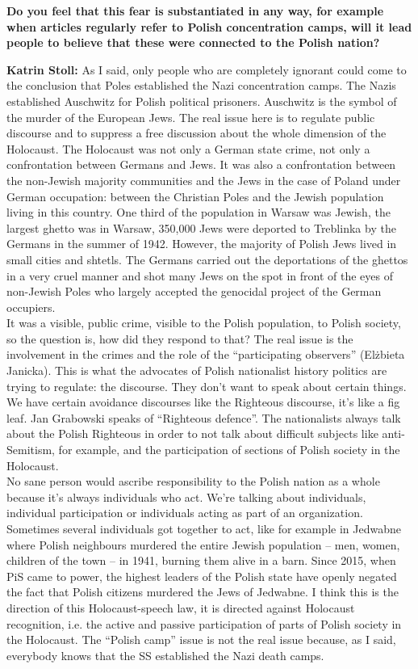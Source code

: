 \textbf{Do you feel that this fear is substantiated in any way, for example when articles regularly refer to Polish concentration camps, will it lead people to believe that these were connected to the Polish nation?}

\textbf{Katrin Stoll:} As I said, only people who are completely ignorant could come to the conclusion that Poles established the Nazi concentration camps. The Nazis established Auschwitz for Polish political prisoners. Auschwitz is the symbol of the murder of the European Jews. The real issue here is to regulate public discourse and to suppress a free discussion about the whole dimension of the Holocaust. The Holocaust was not only a German state crime, not only a confrontation between Germans and Jews. It was also a confrontation between the non-Jewish majority communities and the Jews in the case of Poland under German occupation: between the Christian Poles and the Jewish population living in this country. One third of the population in Warsaw was Jewish, the largest ghetto was in Warsaw, 350,000 Jews were deported to Treblinka by the Germans in the summer of 1942. However, the majority of Polish Jews lived in small cities and shtetls. The Germans carried out the deportations of the ghettos in a very cruel manner and shot many Jews on the spot in front of the eyes of non-Jewish Poles who largely accepted the genocidal project of the German occupiers.\\ 
It was a visible, public crime, visible to the Polish population, to Polish society, so the question is, how did they respond to that?  The real issue is the involvement in the crimes and the role of the ``participating observers'' (Elżbieta Janicka). This is what the advocates of Polish nationalist history politics are trying to regulate: the discourse. They don’t want to speak about certain things. We have certain avoidance discourses like the Righteous discourse, it’s like a fig leaf. Jan Grabowski speaks of ``Righteous defence''. The nationalists always talk about the Polish Righteous in order to not talk about difficult subjects like anti-Semitism, for example, and the participation of sections of Polish society in the Holocaust.\\ 
No sane person would ascribe responsibility to the Polish nation as a whole because it’s always individuals who act. We’re talking about individuals, individual participation or individuals acting as part of an organization. Sometimes several individuals got together to act, like for example in Jedwabne where Polish neighbours murdered the entire Jewish population – men, women, children of the town – in 1941, burning them alive in a barn. Since 2015, when PiS came to power, the highest leaders of the Polish state have openly negated the fact that Polish citizens murdered the Jews of Jedwabne. I think this is the direction of this Holocaust-speech law, it is directed against Holocaust recognition, i.e. the active and passive participation of parts of Polish society in the Holocaust. The ``Polish camp'' issue is not the real issue because, as I said, everybody knows that the SS established the Nazi death camps. 

